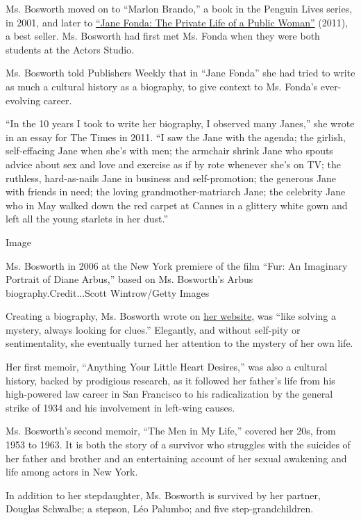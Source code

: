 Ms. Bosworth moved on to ``Marlon Brando,'' a book in the Penguin Lives
series, in 2001, and later to
\href{https://www.nytimes3xbfgragh.onion/2011/09/25/opinion/sunday/the-dark-tie-between-jane-fonda-and-her-biographer.html}{``Jane
Fonda: The Private Life of a Public Woman''} (2011), a best seller. Ms.
Bosworth had first met Ms. Fonda when they were both students at the
Actors Studio.

Ms. Bosworth told Publishers Weekly that in ``Jane Fonda'' she had tried
to write as much a cultural history as a biography, to give context to
Ms. Fonda's ever-evolving career.

``In the 10 years I took to write her biography, I observed many
Janes,'' she wrote in an essay for The Times in 2011. ``I saw the Jane
with the agenda; the girlish, self-effacing Jane when she's with men;
the armchair shrink Jane who spouts advice about sex and love and
exercise as if by rote whenever she's on TV; the ruthless, hard-as-nails
Jane in business and self-promotion; the generous Jane with friends in
need; the loving grandmother-matriarch Jane; the celebrity Jane who in
May walked down the red carpet at Cannes in a glittery white gown and
left all the young starlets in her dust.''

Image

Ms. Bosworth in 2006 at the New York premiere of the film ``Fur: An
Imaginary Portrait of Diane Arbus,'' based on Ms. Bosworth's Arbus
biography.Credit...Scott Wintrow/Getty Images

Creating a biography, Ms. Bosworth wrote on
\href{http://www.pbosworth.com/}{her website}, was ``like solving a
mystery, always looking for clues.'' Elegantly, and without self-pity or
sentimentality, she eventually turned her attention to the mystery of
her own life.

Her first memoir, ``Anything Your Little Heart Desires,'' was also a
cultural history, backed by prodigious research, as it followed her
father's life from his high-powered law career in San Francisco to his
radicalization by the general strike of 1934 and his involvement in
left-wing causes.

Ms. Bosworth's second memoir, ``The Men in My Life,'' covered her 20s,
from 1953 to 1963. It is both the story of a survivor who struggles with
the suicides of her father and brother and an entertaining account of
her sexual awakening and life among actors in New York.

In addition to her stepdaughter, Ms. Bosworth is survived by her
partner, Douglas Schwalbe; a stepson, Léo Palumbo; and five
step-grandchildren.

